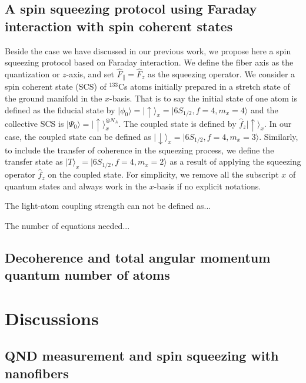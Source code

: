 \documentclass[preprint,aps,pra,onecolumn,superscriptaddress]{revtex4-1} %
\def\ket#1{\lvert{#1}\rangle}%
\begin{document}
\subsection{A spin squeezing protocol using Faraday interaction with spin coherent states}
Beside the case we have discussed in our previous work, we propose here a spin squeezing protocol based on Faraday interaction.
We define the fiber axis as the quantization or $ z $-axis, and set $ \hat{F}_\parallel=\hat{F}_z $ as the squeezing operator. 
We consider a spin coherent state (SCS) of $ ^{133} $Cs atoms initially prepared in a stretch state of the ground manifold in the $ x $-basis. 
That is to say the initial state of one atom is defined as the fiducial state by $ \ket{\phi_0}=\ket{\uparrow}_x = \ket{6S_{1/2},f=4,m_x=4} $ and the collective SCS is $ \ket{\Psi_0}=\ket{\uparrow}_x^{\otimes N_A} $.
The coupled state is defined by $ \hat{f}_z\ket{\uparrow}_x $.
In our case, the coupled state can be defined as $ \ket{\downarrow}_x=\ket{6S_{1/2},f=4,m_x=3} $.
Similarly, to include the transfer of coherence in the squeezing process, we define the transfer state as $ \ket{T}_x=\ket{6S_{1/2},f=4,m_x=2} $ as a result of applying the squeezing operator $ \hat{f}_z$ on the coupled state. 
For simplicity, we remove all the subscript $ x $ of quantum states and always work in the $ x $-basis if no explicit notations. 

The light-atom coupling strength can not be defined as...

The number of equations needed...

\subsection{Decoherence and total angular momentum quantum number of atoms}

\section{Discussions} \label{Sec::Discussions}



\subsection{QND measurement and spin squeezing with nanofibers} \label{Sec::Nanofiber}
\end{document}
